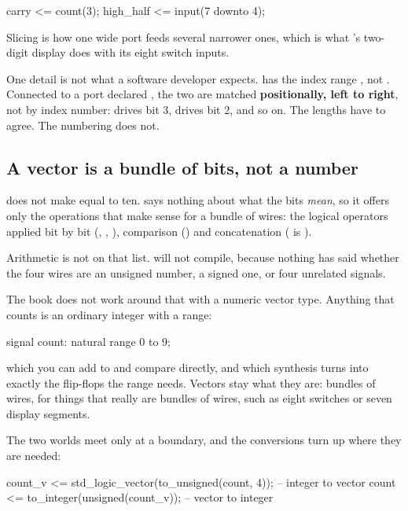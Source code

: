 \begin{vhdlcode}
carry     <= count(3);
high_half <= input(7 downto 4);
\end{vhdlcode}

Slicing is how one wide port feeds several narrower ones, which is what
's two-digit display does with its eight switch inputs.

One detail is not what a software developer expects.  has the index range
, not . Connected to a port declared
, the two are matched \textbf{positionally, left to right}, not
by index number:  drives bit 3,  drives bit 2, and so on. The lengths
have to agree. The numbering does not.

\subsection*{A vector is a bundle of bits, not a number}
 does not make  equal to ten.  says
nothing about what the bits \emph{mean}, so it offers only the operations that make sense for a
bundle of wires: the logical operators applied bit by bit (, ,
), comparison () and concatenation ( is
).

Arithmetic is not on that list.  will not compile, because nothing has said whether
the four wires are an unsigned number, a signed one, or four unrelated signals.

The book does not work around that with a numeric vector type. Anything that counts is an ordinary
integer with a range:

\begin{vhdlcode}
signal count: natural range 0 to 9;
\end{vhdlcode}

which you can add to and compare directly, and which synthesis turns into exactly the flip-flops the
range needs. Vectors stay what they are: bundles of wires, for things that really are bundles of
wires, such as eight switches or seven display segments.

The two worlds meet only at a boundary, and the conversions turn up where they are needed:

\begin{vhdlcode}
count_v <= std_logic_vector(to_unsigned(count, 4));   -- integer to vector
count   <= to_integer(unsigned(count_v));             -- vector to integer
\end{vhdlcode}

